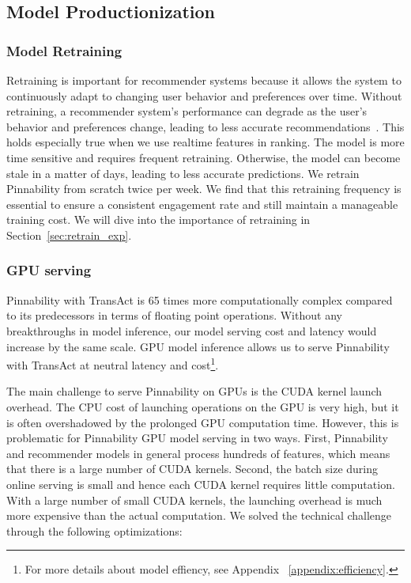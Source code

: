 \subsection{Model Productionization}

\subsubsection{Model Retraining}
Retraining is important for recommender systems because it allows the system to continuously adapt to changing user behavior and preferences over time. Without retraining, a recommender system's performance can degrade as the user's behavior and preferences change, leading to less accurate recommendations~\cite{tech_debt}. 
This holds especially true when we use realtime features in ranking. The model is more time sensitive and requires frequent retraining. 
Otherwise, the model can become stale in a matter of days, leading to less accurate predictions. 
We retrain Pinnability from scratch twice per week. We find that this retraining frequency is essential to ensure a consistent engagement rate and still maintain a manageable training cost.
We will dive into the importance of retraining in Section~\ref{sec:retrain_exp}.


\subsubsection{GPU serving} Pinnability with TransAct is 65 times more computationally complex compared to its predecessors in terms of floating point operations. Without any breakthroughs in model inference, our model serving cost and latency would increase by the same scale. GPU model inference allows us to serve Pinnability with TransAct at neutral latency and cost\footnote{For more details about model effiency, see Appendix ~\ref{appendix:efficiency}.}. 

The main challenge to serve Pinnability on GPUs is the CUDA kernel launch overhead. The CPU cost of launching operations on the GPU is very high, but it is often overshadowed by the prolonged GPU computation time. However, this is problematic for Pinnability GPU model serving in two ways. First, Pinnability and recommender models in general process hundreds of features, which means that there is a large number of CUDA kernels. Second, the batch size during online serving is small and hence each CUDA kernel requires little computation. With a large number of small CUDA kernels, the launching overhead is much more expensive than the actual computation. We solved the technical challenge through the following optimizations:

